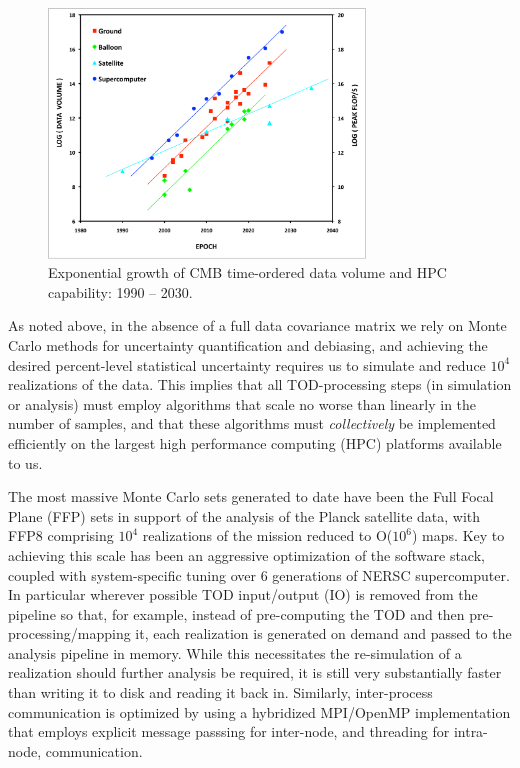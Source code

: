 \begin{figure}[htbp]
\centering
\includegraphics[width=0.75\textwidth]{Analysis/cmb_hpc_scaling}
\caption{Exponential growth of CMB time-ordered data volume and HPC capability: 1990 -- 2030.}
\label{fig_cmb_hpc_scaling}
\end{figure}

As noted above, in the absence of a full data covariance matrix we rely on Monte Carlo methods for uncertainty quantification and debiasing, and achieving the desired percent-level statistical uncertainty requires us to simulate and reduce $10^4$ realizations of the data. This implies that all TOD-processing steps (in simulation or analysis) must employ algorithms that scale no worse than linearly in the number of samples, and that these algorithms must {\em collectively} be implemented efficiently on the largest high performance computing (HPC) platforms available to us. 

The most massive Monte Carlo sets generated to date have been the Full Focal Plane (FFP) sets in support of the analysis of the Planck satellite data, with FFP8 comprising $10^4$ realizations of the mission reduced to O($10^6$) maps. Key to achieving this scale has been an aggressive optimization of the software stack, coupled with system-specific tuning over 6 generations of NERSC supercomputer. In particular wherever possible TOD input/output (IO) is removed from the pipeline so that, for example, instead of pre-computing the TOD and then pre-processing/mapping it, each realization is generated on demand and passed to the analysis pipeline in memory. While this necessitates the re-simulation of a realization should further analysis be required, it is still very substantially faster than writing it to disk and reading it back in. Similarly, inter-process communication is optimized by using a hybridized MPI/OpenMP implementation that employs explicit message passsing for inter-node, and threading for intra-node, communication.

